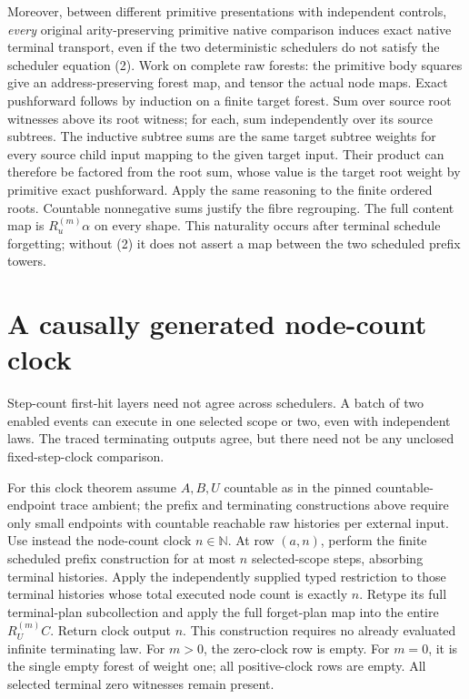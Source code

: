 \documentclass[11pt]{article}
\begin{document}
Moreover, between different primitive presentations with independent controls, \emph{every} original arity-preserving primitive native comparison induces exact native terminal transport, even if the two deterministic schedulers do not satisfy the scheduler equation (2). Work on complete raw forests: the primitive body squares give an address-preserving forest map, and tensor the actual node maps. Exact pushforward follows by induction on a finite target forest. Sum over source root witnesses above its root witness; for each, sum independently over its source subtrees. The inductive subtree sums are the same target subtree weights for every source child input mapping to the given target input. Their product can therefore be factored from the root sum, whose value is the target root weight by primitive exact pushforward. Apply the same reasoning to the finite ordered roots. Countable nonnegative sums justify the fibre regrouping. The full content map is $R_u^{(m)}\alpha$ on every shape. This naturality occurs after terminal schedule forgetting; without (2) it does not assert a map between the two scheduled prefix towers.

\section{A causally generated node-count clock}
Step-count first-hit layers need not agree across schedulers. A batch of two enabled events can execute in one selected scope or two, even with independent laws. The traced terminating outputs agree, but there need not be any unclosed fixed-step-clock comparison.

For this clock theorem assume $A,B,U$ countable as in the pinned countable-endpoint trace ambient; the prefix and terminating constructions above require only small endpoints with countable reachable raw histories per external input. Use instead the node-count clock $n\in\mathbb N$. At row $(a,n)$, perform the finite scheduled prefix construction for at most $n$ selected-scope steps, absorbing terminal histories. Apply the independently supplied typed restriction to those terminal histories whose total executed node count is exactly $n$. Retype its full terminal-plan subcollection and apply the full forget-plan map into the entire $R_U^{(m)}C$. Return clock output $n$. This construction requires no already evaluated infinite terminating law. For $m>0$, the zero-clock row is empty. For $m=0$, it is the single empty forest of weight one; all positive-clock rows are empty. All selected terminal zero witnesses remain present.
\end{document}
